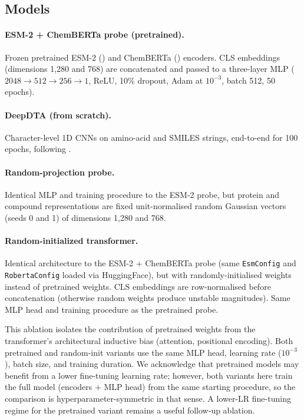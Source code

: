 \documentclass[11pt,a4paper]{article}
\begin{document}
\subsection{Models}

\paragraph{ESM-2 + ChemBERTa probe (pretrained).}
Frozen pretrained ESM-2 () and ChemBERTa
() encoders.
CLS embeddings (dimensions 1{,}280 and 768) are concatenated and passed to a
three-layer MLP ($2048 \to 512 \to 256 \to 1$, ReLU, 10\% dropout, Adam at
$10^{-3}$, batch 512, 50 epochs).

\paragraph{DeepDTA (from scratch).}
Character-level 1D CNNs on amino-acid and SMILES strings, end-to-end for 100
epochs, following \citet{ozturk2018deepdta}.

\paragraph{Random-projection probe.}
Identical MLP and training procedure to the ESM-2 probe, but protein and compound
representations are fixed unit-normalised random Gaussian vectors (seeds 0 and 1)
of dimensions 1{,}280 and 768.

\paragraph{Random-initialized transformer.}
Identical architecture to the ESM-2 + ChemBERTa probe (same \texttt{EsmConfig} and
\texttt{RobertaConfig} loaded via HuggingFace), but with randomly-initialised
weights instead of pretrained weights.
CLS embeddings are row-normalised before concatenation (otherwise random weights
produce unstable magnitudes).
Same MLP head and training procedure as the pretrained probe.

This ablation isolates the contribution of pretrained weights from the
transformer's architectural inductive bias (attention, positional encoding).
Both pretrained and random-init variants use the same MLP head, learning rate
($10^{-3}$), batch size, and training duration.
We acknowledge that pretrained models may benefit from a lower fine-tuning
learning rate; however, both variants here train the full model
(encoders $+$ MLP head) from the same starting procedure, so the comparison
is hyperparameter-symmetric in that sense.
A lower-LR fine-tuning regime for the pretrained variant remains a useful
follow-up ablation.
\end{document}
